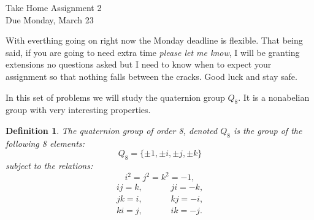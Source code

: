 \documentclass[11pt]{article}
\newtheorem{definition}{Definition}
\begin{document}
\begin{center}
\Large {Take Home Assignment 2}\\
\small {Due Monday, March 23}
\end{center}
With everthing going on right now the Monday deadline is flexible.  That being said, if you are going to need extra time \textit{please let me know}, I will be granting extensions no questions asked but I need to know when to expect your assignment so that nothing falls between the cracks.  Good luck and stay safe.

In this set of problems we will study the quaternion group $Q_8$.  It is a nonabelian group with very interesting properties.
\begin{definition}
  The \textit{quaternion group of order 8}, denoted $Q_8$ is the group of the following 8 elements:
  \[Q_8 = \{\pm1,\pm i, \pm j, \pm k\}\]
  subject to the relations:
  \[i^2 = j^2 = k^2 = -1,\]
  \begin{eqnarray*}
    ij = k, & \hspace{20pt} & ji = -k,\\
    jk = i, & \hspace{20pt} & kj = -i,\\
    ki = j, & \hspace{20pt} & ik = -j.
  \end{eqnarray*}
\end{definition}
\end{document}
